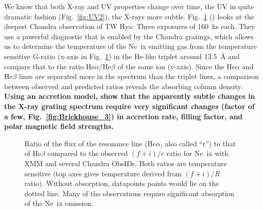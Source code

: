 \documentclass[letterpaper,11pt,twocolumn]{article}
\begin{document}
We know that both X-ray and UV properties change over time, the UV in
quite dramatic fashion (Fig.~\ref{fig:UV2}), the X-rays more
subtle. Fig.~\ref{fig:allspec} () looks
at the deepest Chandra observation of TW Hya: Three exposures of
160~ks each. They use a powerful diagnostic that is enabled by the
Chandra gratings, which allows us to determine the temperature of the Ne~{\sc ix}
emitting gas from the temperature sensitive G-ratio  (x-axis in Fig.~\ref{fig:allspec}) in the He-like
triplet around 13.5~\AA{} and compare that to the
ratio He$\alpha$/He$\beta$ of the same ion (y-axis). Since the He$\alpha$ and
He$\beta$ lines are separated more in the spectrum than the triplet
lines, a comparison between observed and predicted ratios reveals the
absorbing column density. \textbf{Using an accretion model,
  \citet{2012ApJ...760L..21B} show that the apparently subtle changes
  in the X-ray grating spectrum require very significant changes
  (factor of a few, Fig.~\ref{fig:Brickhouse_3}) in accretion rate, filling factor, and polar
  magnetic field strengths. }

\begin{figure}[h!]
\centering
{}
\caption{Ratio of the flux of the resonance line (He$\alpha$, also
  called ``r'') to that of He$\beta$ compared to the observed
  $(f+i)/r$ ratio for Ne~{\sc ix} with XMM and several Chandra
  ObsIDs. Both ratios are temperature sensitive (top axes gives
  temperature derived from $(f+i)/R$ ratio). Without absorption,
  datapoints points would lie on the dotted line.  Many of the
  observations require significant absorption of the Ne~{\sc ix}
  emission.
\label{fig:allspec} }
\end{figure}
\end{document}
